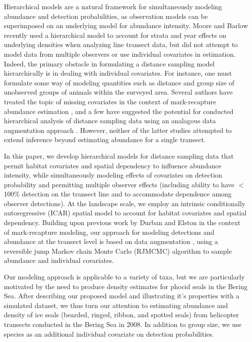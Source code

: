 \documentclass[10pt]{article}
\begin{document}
Hierarchical models are a natural framework for simultaneously modeling abundance and detection probabilities, as observation models can be superimposed on an underlying model for abundance intensity.  Moore and Barlow \cite{MooreBarlow2011} recently used a hierarchical model to account for strata and year effects on underlying densities when analyzing line transect data, but did not attempt to model data from multiple observers or use individual covariates in estimation. Indeed, the primary obstacle in formulating a distance sampling model hierarchically is in dealing with individual covariates.  For instance, one must formulate some way of modeling quantities such as distance and group size of unobserved groups of animals within the surveyed area.  Several authors have treated the topic of missing covariates in the context of mark-recapture abundance estimation \cite{DurbanElston2005,RoyleDorazio2008,Royle2009},
and a few have suggested the potential for conducted hierarchical analysis of distance sampling data using an analagous data augmentation approach \cite{RoyleDorazio2008,LinkBarker2010}.  However, neither of the latter studies attempted to extend inference beyond estimating abundance for a single transect.

In this paper, we develop hierarchical models for distance sampling data that permit habitat covariates and spatial dependency to influence abundance intensity, while simultaneously modeling effects of covariates on detection probability and permitting multiple observer effects (including ability to have $<$100\% detection on the transect line and to accommodate dependence among observer detections).  At the landscape scale, we employ an intrinsic conditionally autoregressive (ICAR) spatial model \cite{BesagEtAl1991,BesagKooperberg1995,RueHeld2005} to account for habitat covariates and spatial dependency.  Building upon previous work by Durban and Elston \cite{DurbanElston2005} in the context of mark-recapture modeling, our approach for modeling detections and abundance at the transect level is based on data augmentation \cite{TannerWong1987,RoyleEtAl2007b}, using a reversible jump Markov chain Monte Carlo (RJMCMC) algorithm \cite{CarlinChib1995,Green1995} to sample abundance and individual covariates.

Our modeling approach is applicable to a variety of taxa, but we are particularly motivated by the need to produce density estimates for phocid seals in the Bering Sea.  After describing our proposed model and illustrating it's properties with a simulated dataset, we thus turn our attention to estimating abundance and density of ice seals (bearded, ringed, ribbon, and spotted seals) from helicopter transects conducted in the Bering Sea in 2008.  In addition to group size, we use species as an additional individual covariate on detection probabilities.
\end{document}
